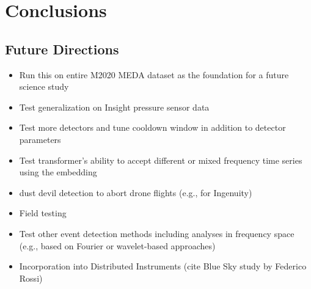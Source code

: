 \section{Conclusions}

\subsection{Future Directions}
\begin{itemize}
    \item Run this on entire M2020 MEDA dataset as the foundation for a future science study
    \item Test generalization on Insight pressure sensor data
    \item Test more detectors and tune cooldown window in addition to detector parameters
    \item Test transformer's ability to accept different or mixed frequency time series using the embedding
    \item dust devil detection to abort drone flights (e.g., for Ingenuity)
    \item Field testing
    \item Test other event detection methods including analyses in frequency space (e.g., based on Fourier or wavelet-based approaches)
    \item Incorporation into Distributed Instruments (cite Blue Sky study by Federico Rossi)
\end{itemize}